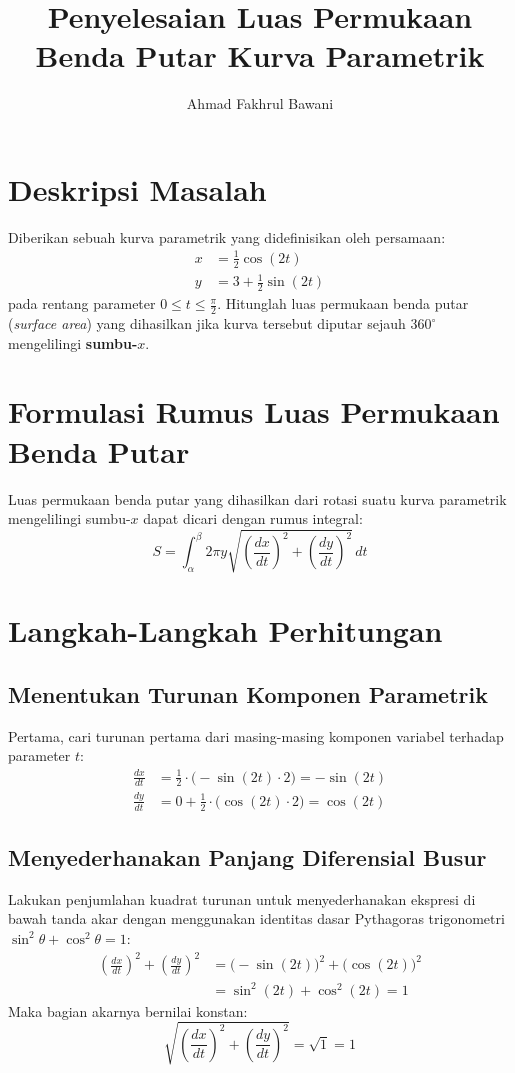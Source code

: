 \documentclass[11pt,a4paper]{article}
\title{\textbf{Penyelesaian Luas Permukaan Benda Putar Kurva Parametrik}}
\author{Ahmad Fakhrul Bawani}
\date{}
\begin{document}
\maketitle

\section{Deskripsi Masalah}
Diberikan sebuah kurva parametrik yang didefinisikan oleh persamaan:
\begin{align}
  x &= \frac{1}{2}\cos(2t) \\
  y &= 3 + \frac{1}{2}\sin(2t)
\end{align}
pada rentang parameter $0 \le t \le \frac{\pi}{2}$. Hitunglah luas permukaan benda putar (\textit{surface area}) yang dihasilkan jika kurva tersebut diputar sejauh $360^\circ$ mengelilingi \textbf{sumbu-}$x$.

\section{Formulasi Rumus Luas Permukaan Benda Putar}
Luas permukaan benda putar yang dihasilkan dari rotasi suatu kurva parametrik mengelilingi sumbu-$x$ dapat dicari dengan rumus integral:
\begin{equation}
  S = \int_{\alpha}^{\beta} 2\pi y \sqrt{\left(\frac{dx}{dt}\right)^2 + \left(\frac{dy}{dt}\right)^2} \, dt
\end{equation}

\section{Langkah-Langkah Perhitungan}

\subsection{Menentukan Turunan Komponen Parametrik}
Pertama, cari turunan pertama dari masing-masing komponen variabel terhadap parameter $t$:
\begin{align*}
  \frac{dx}{dt} &= \frac{1}{2} \cdot \Big(-\sin(2t) \cdot 2\Big) = -\sin(2t) \\
  \frac{dy}{dt} &= 0 + \frac{1}{2} \cdot \Big(\cos(2t) \cdot 2\Big) = \cos(2t)
\end{align*}

\subsection{Menyederhanakan Panjang Diferensial Busur}
Lakukan penjumlahan kuadrat turunan untuk menyederhanakan ekspresi di bawah tanda akar dengan menggunakan identitas dasar Pythagoras trigonometri $\sin^2\theta + \cos^2\theta = 1$:
\begin{align*}
  \left(\frac{dx}{dt}\right)^2 + \left(\frac{dy}{dt}\right)^2 &= \Big(-\sin(2t)\Big)^2 + \Big(\cos(2t)\Big)^2 \\
  &= \sin^2(2t) + \cos^2(2t) = 1
\end{align*}
Maka bagian akarnya bernilai konstan:
\begin{equation*}
  \sqrt{\left(\frac{dx}{dt}\right)^2 + \left(\frac{dy}{dt}\right)^2} = \sqrt{1} = 1
\end{equation*}
\end{document}
